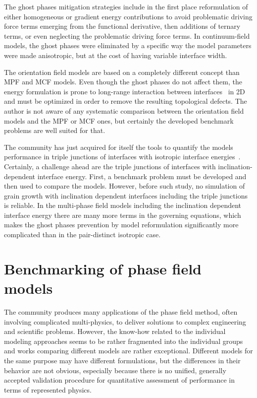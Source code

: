 	The ghost phases mitigation strategies include in the first place reformulation of either homogeneous or gradient energy contributions to avoid problematic driving force terms emerging from the functional derivative, then additions of ternary terms, or even neglecting the problematic driving force terms. In continuum-field models, the ghost phases were eliminated by a specific way the model parameters were made anisotropic, but at the cost of having variable interface width. 
	
	The orientation field models are based on a completely different concept than MPF and MCF models. Even though the ghost phases do not affect them, the energy formulation is prone to long-range interaction between interfaces~\cite{Korbuly2017} in 2D and must be optimized in order to remove the resulting topological defects. The author is not aware of any systematic comparison between the orientation field models and the MPF or MCF ones, but certainly the developed benchmark problems are well suited for that.
	
	The community has just acquired for itself the tools to quantify the models performance in triple junctions of interfaces with isotropic interface energies~\cite{Daubner2023}. Certainly, a challenge ahead are the triple junctions of interfaces with inclination-dependent interface energy.	First, a benchmark problem must be developed and then used to compare the models. However, before such study, no simulation of grain growth with inclination dependent interfaces including the triple junctions is reliable. In the multi-phase field models including the inclination dependent interface energy there are many more terms in the governing equations, which makes the ghost phases prevention by model reformulation significantly more complicated than in the pair-distinct isotropic case. 

\section{Benchmarking of phase field models}\label{sec_benchmarking_in_PF_discussed}
The community produces many applications of the phase field method, often involving complicated multi-physics, to deliver solutions to complex engineering and scientific problems. However, the know-how related to the individual modeling approaches seems to be rather fragmented into the individual groups and works comparing different models are rather exceptional. Different models for the same purpose may have different formulations, but the differences in their behavior are not obvious, especially because there is no unified, generally accepted validation procedure for quantitative assessment of performance in terms of represented physics. 

